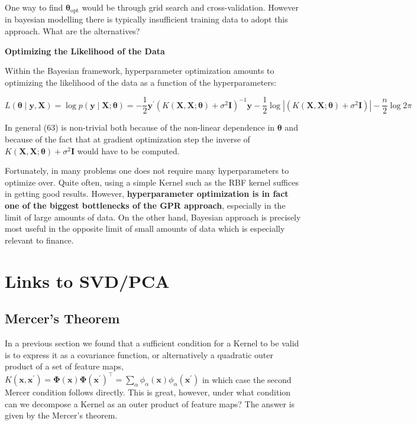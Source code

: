 \documentclass[11pt]{article}
\theoremstyle{plain} %
\theoremstyle{remark}
\begin{document}
One way to find $\boldsymbol{\theta}_{\text {opt}}$ would be through grid search and
cross-validation. However in bayesian modelling there is typically insufficient
training data to adopt this approach. What are the alternatives?

\textbf{Optimizing the Likelihood of the Data}

Within the Bayesian framework, hyperparameter optimization amounts to optimizing
the likelihood of the data as a function of the hyperparameters:

$$
  L(\boldsymbol{\theta} \mid \mathbf{y}, \mathbf{X}) =\log p(\mathbf{y} \mid \mathbf{X} ; \boldsymbol{\theta})
  =-\frac{1}{2} \mathbf{y}^{\prime}\left(K(\mathbf{X}, \mathbf{X} ; \boldsymbol{\theta})+\sigma^{2} \mathbf{I}\right)^{-1} \mathbf{y} -\frac{1}{2} \log \left|\left(K(\mathbf{X}, \mathbf{X} ; \boldsymbol{\theta})+\sigma^{2} \mathbf{I}\right)\right|-\frac{n}{2} \log 2 \pi
$$

In general (63) is non-trivial both because of the non-linear dependence in
$\boldsymbol{\theta}$ and because of the fact that at gradient optimization step the inverse
of $K(\mathbf{X}, \mathbf{X} ; \boldsymbol{\theta})+\sigma^{2} \mathbf{I}$ would
have to be computed.

Fortunately, in many problems one does not require many hyperparameters to
optimize over. Quite often, using a simple Kernel such as the RBF kernel suffices
in getting good results. However, \textbf{hyperparameter optimization is in fact one of
  the biggest bottlenecks of the GPR approach}, especially in the limit of large
amounts of data. On the other hand, Bayesian approach is precisely most useful
in the opposite limit of small amounts of data which is especially relevant to
finance.

\section{Links to SVD/PCA}
\subsection{Mercer's Theorem}
In a previous section we found that a sufficient condition for a Kernel to be
valid is to express it as a covariance function, or alternatively a quadratic
outer product of a set of feature maps, $K\left(\mathbf{x},
  \mathbf{x}^{\prime}\right)=\boldsymbol{\Phi}(\mathbf{x})
  \boldsymbol{\Phi}\left(\mathbf{x}^{\prime}\right)^\top=\sum_{\alpha}
  \phi_{\alpha}(\mathbf{x}) \phi_{\alpha}\left(\mathbf{x}^{\prime}\right)$ in
which case the second Mercer condition follows directly. This is great, however, under what condition
can we decompose a Kernel as an outer product of feature maps? The answer is given by the Mercer's theorem.
\end{document}
